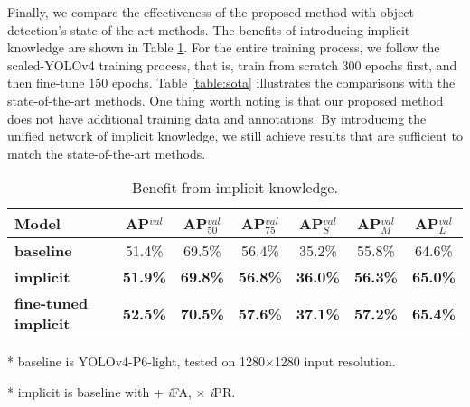 \documentclass[10pt,twocolumn,letterpaper]{article}
\begin{document}
Finally, we compare the effectiveness of the proposed method with object detection's state-of-the-art methods. The benefits of introducing implicit knowledge are shown in Table \ref{table:as}. For the entire training process, we follow the scaled-YOLOv4 \cite{wang2020scaled} training process, that is, train from scratch 300 epochs first, and then fine-tune 150 epochs. Table \ref{table:sota} illustrates the comparisons with the state-of-the-art methods. One thing worth noting is that our proposed method does not have additional training data and annotations. By introducing the unified network of implicit knowledge, we still achieve results that are sufficient to match the state-of-the-art methods.

\begin{table}[h]
	\centering
	\vspace{-2mm}
	\begin{threeparttable}[h]
		\footnotesize
		\caption{Benefit from implicit knowledge.}
		\label{table:as}
		\setlength\tabcolsep{2.5pt}
		\begin{tabular}{lcccccc}
			\toprule
			\textbf{Model} & \textbf{AP$^{val}$} & \textbf{AP$^{val}_{50}$} & \textbf{AP$^{val}_{75}$} & \textbf{AP$^{val}_{S}$} & \textbf{AP$^{val}_{M}$} & \textbf{AP$^{val}_{L}$} \\				
			\midrule
			\textbf{baseline} & 51.4\% & 69.5\% & 56.4\% & 35.2\% & 55.8\% & 64.6\% \\
			\textbf{implicit} & \textbf{51.9\%} & \textbf{69.8\%} & \textbf{56.8\%} & \textbf{36.0\%} & \textbf{56.3\%} & \textbf{65.0\%} \\
			\textbf{fine-tuned implicit} & \textbf{52.5\%} & \textbf{70.5\%} & \textbf{57.6\%} & \textbf{37.1\%} & \textbf{57.2\%} & \textbf{65.4\%} \\		
			\bottomrule
		\end{tabular}
		\begin{tablenotes}[flushleft]
			\footnotesize
			\item[*] baseline is YOLOv4-P6-light, tested on 1280$\times$1280 input resolution.
			\item[*] implicit is baseline with + \textit{i}FA, $\times$ \textit{i}PR.
		\end{tablenotes}
	\end{threeparttable}
    \vspace{-4mm}
\end{table}
\end{document}
